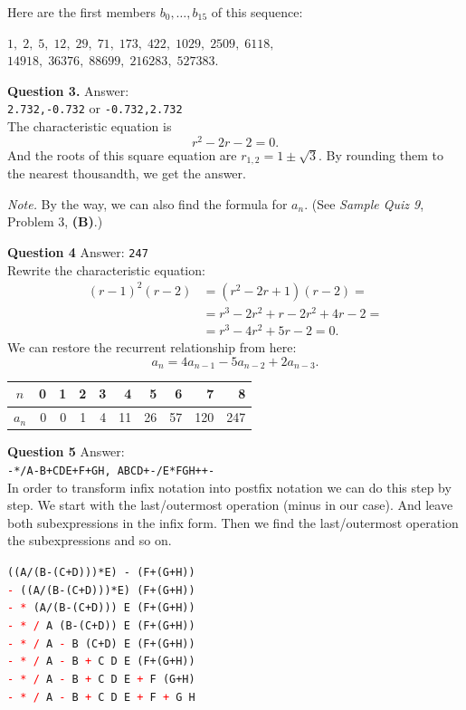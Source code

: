 \documentclass[jou]{apa6}
\begin{document}
Here are the first members $b_0,\ldots,b_{15}$ of this sequence:

$1,\; 2,\; 5,\; 12,\; 29,\; 71,\; 173,\; 422,\; 1029,\; 2509,\; 6118,$
$14918,\; 36376,\; 88699,\; 216283,\; 527383$.




\vspace{6pt}
{\bf Question 3.} Answer:\\ {\tt 2.732,-0.732} or 
{\tt -0.732,2.732} \\
The characteristic equation is 
$$r^2 - 2r - 2 = 0.$$
And the roots of this square equation are 
$r_{1,2} = 1 \pm \sqrt{3}$.
By rounding them to the nearest thousandth, we get
the answer. 

{\em Note.} By the way, we can also 
find the formula for $a_n$. (See {\em Sample Quiz 9}, 
Problem 3, {\bf (B)}.)

\vspace{6pt}
{\bf Question 4} Answer: {\tt 247}\\
Rewrite the characteristic equation:
\begin{align}
(r-1)^2(r-2) & = (r^2 - 2r + 1)(r-2) = \nonumber \\
 & = r^3 - 2r^2 + r - 2r^2 + 4r - 2 = \nonumber \\
 & = r^3 - 4r^2 + 5r - 2 = 0. \nonumber
\end{align}
We can restore the recurrent relationship from here: 
$$a_{n} = 4a_{n-1} - 5a_{n-2} + 2a_{n-3}.$$

\begin{tabular}{|c|r|r|r|r|r|r|r|r|r|} \hline
$n$   & 0 & 1 & 2 & 3 & 4  & 5  & 6  & 7   & 8 \\ \hline
$a_n$ & 0 & 0 & 1 & 4 & 11 & 26 & 57 & 120 & 247 \\ \hline
\end{tabular}


\vspace{6pt}
{\bf Question 5} Answer:\\ 
{\tt -*/A-B+CDE+F+GH, ABCD+-/E*FGH++-}\\
In order to transform infix notation into postfix notation
we can do this step by step. We start with the last/outermost operation
(minus in our case). And leave both subexpressions in 
the infix form. Then we find the last/outermost operation 
the subexpressions and so on.

{\tt ((A/(B-(C+D)))*E) - (F+(G+H))}\\
{\tt \textcolor{red}{-} ((A/(B-(C+D)))*E) (F+(G+H))}\\
{\tt \textcolor{red}{- *} (A/(B-(C+D))) E (F+(G+H))}\\
{\tt \textcolor{red}{- * /} A (B-(C+D)) E (F+(G+H))}\\
{\tt \textcolor{red}{- * /} A \textcolor{red}{-} B (C+D) E (F+(G+H))}\\
{\tt \textcolor{red}{- * /} A \textcolor{red}{-} B \textcolor{red}{+} C D E (F+(G+H))}\\
{\tt \textcolor{red}{- * /} A \textcolor{red}{-} B \textcolor{red}{+} C D E \textcolor{red}{+} F (G+H)}\\
{\tt \textcolor{red}{- * /} A \textcolor{red}{-} B \textcolor{red}{+} C D E \textcolor{red}{+} F \textcolor{red}{+} G H}\\
\end{document}
